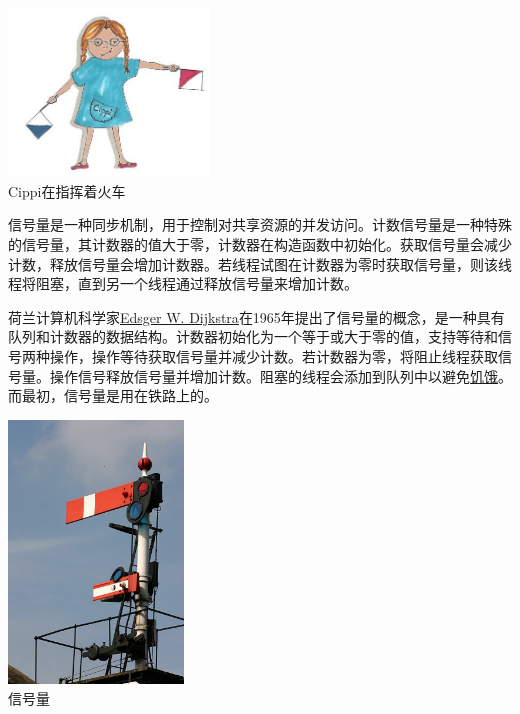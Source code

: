 \begin{center}
\includegraphics[width=0.4\textwidth]{content/3/chapter6/images/15.png}\\
Cippi在指挥着火车
\end{center}

信号量是一种同步机制，用于控制对共享资源的并发访问。计数信号量是一种特殊的信号量，其计数器的值大于零，计数器在构造函数中初始化。获取信号量会减少计数，释放信号量会增加计数器。若线程试图在计数器为零时获取信号量，则该线程将阻塞，直到另一个线程通过释放信号量来增加计数。

\begin{tcolorbox}[breakable,enhanced jigsaw,colback=blue!5!white,colframe=blue!75!black,title={Edsger W. Dijkstra发明了信号量}]
	
荷兰计算机科学家\href{https://en.wikipedia.org/wiki/Edsger_W._Dijkstra}{Edsger W. Dijkstra}在1965年提出了信号量的概念，是一种具有队列和计数器的数据结构。计数器初始化为一个等于或大于零的值，支持等待和信号两种操作，操作等待获取信号量并减少计数。若计数器为零，将阻止线程获取信号量。操作信号释放信号量并增加计数。阻塞的线程会添加到队列中以避免\href{https://en.wikipedia.org/wiki/Starvation_(computer_science)}{饥饿}。而最初，信号量是用在铁路上的。
	
\end{tcolorbox}

\begin{center}
\includegraphics[width=0.35\textwidth]{content/3/chapter6/images/16.png}\\
信号量
\end{center}


